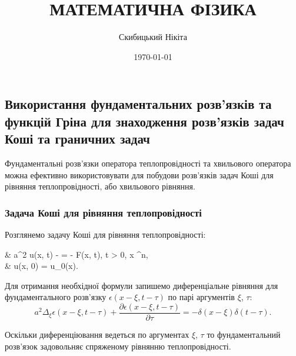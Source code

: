 

\title{{\Huge МАТЕМАТИЧНА ФІЗИКА}}
\author{Скибицький Нікіта}
\date{\today}




	
	\tableofcontents
	
	\setcounter{section}{4}
	\setcounter{subsection}{1}
	\setcounter{subsubsection}{4}
	\setcounter{theorem}{51}
	\setcounter{equation}{48}

\subsection{Використання фундаментальних розв'язків та \allowbreak функцій Гріна для знаходження розв'язків задач Коші та граничних задач}

Фундаментальні розв'язки оператора теплопровідності та хвильового оператора можна ефективно використовувати для побудови розв'язків задач Коші для рівняння теплопровідності, або хвильового рівняння.

\subsubsection{Задача Коші для рівняння теплопровідності}

\begin{example}
	Розглянемо задачу Коші для рівняння теплопровідності:
	\begin{system}
		& a^2 \Delta u(x, t) -  = - F(x, t), \quad t > 0, \quad x \in \RR^n, \\
		& u(x, 0) = u_0(x).
	\end{system}
\end{example}

Для отримання необхідної формули запишемо диференціальне рівняння для фундаментального розв'язку $\epsilon(x - \xi, t - \tau)$ по парі аргументів $\xi$, $\tau$:
\begin{equation}
	\label{eq:3.3.2}
	a^2 \Delta_\xi \epsilon(x - \xi, t - \tau) + \frac{\partial \epsilon(x - \xi, t - \tau)}{\partial \tau} = - \delta(x - \xi) \delta(t - \tau).
\end{equation}

\begin{remark}
	Оскільки диференціювання ведеться по аргументах $\xi$, $\tau$ то фундаментальний розв'язок задовольняє спряженому рівнянню теплопровідності.
\end{remark}

